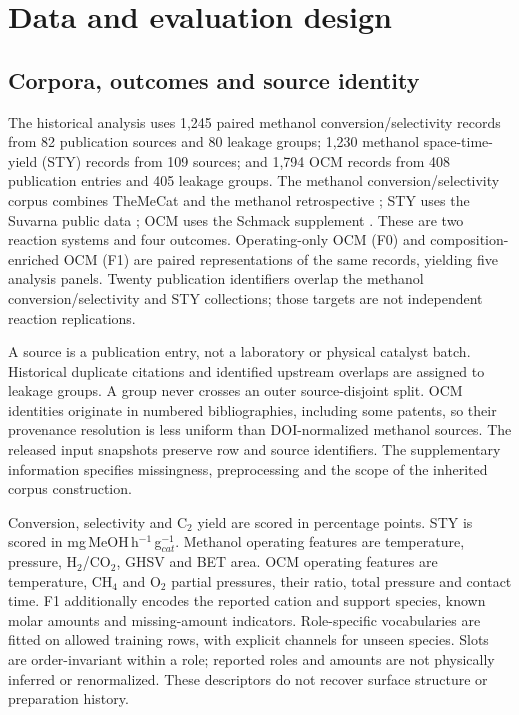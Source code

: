 \documentclass[11pt]{article}
\newcommand{\styunit}{mg\,MeOH\,h$^{-1}$\,g$_{cat}^{-1}$}
\begin{document}
\section{Data and evaluation design}
\subsection{Corpora, outcomes and source identity}
The historical analysis uses 1,245 paired methanol conversion/selectivity records from 82 publication sources and 80 leakage groups; 1,230 methanol space-time-yield (STY) records from 109 sources; and 1,794 OCM records from 408 publication entries and 405 leakage groups. The methanol conversion/selectivity corpus combines TheMeCat and the methanol retrospective \cite{toldy,yan}; STY uses the Suvarna public data \cite{suvarna}; OCM uses the Schmack supplement \cite{schmack}. These are two reaction systems and four outcomes. Operating-only OCM (F0) and composition-enriched OCM (F1) are paired representations of the same records, yielding five analysis panels. Twenty publication identifiers overlap the methanol conversion/selectivity and STY collections; those targets are not independent reaction replications.

A source is a publication entry, not a laboratory or physical catalyst batch. Historical duplicate citations and identified upstream overlaps are assigned to leakage groups. A group never crosses an outer source-disjoint split. OCM identities originate in numbered bibliographies, including some patents, so their provenance resolution is less uniform than DOI-normalized methanol sources. The released input snapshots preserve row and source identifiers. The supplementary information specifies missingness, preprocessing and the scope of the inherited corpus construction.

Conversion, selectivity and C$_2$ yield are scored in percentage points. STY is scored in \styunit. Methanol operating features are temperature, pressure, H$_2$/CO$_2$, GHSV and BET area. OCM operating features are temperature, CH$_4$ and O$_2$ partial pressures, their ratio, total pressure and contact time. F1 additionally encodes the reported cation and support species, known molar amounts and missing-amount indicators. Role-specific vocabularies are fitted on allowed training rows, with explicit channels for unseen species. Slots are order-invariant within a role; reported roles and amounts are not physically inferred or renormalized. These descriptors do not recover surface structure or preparation history.
\end{document}
